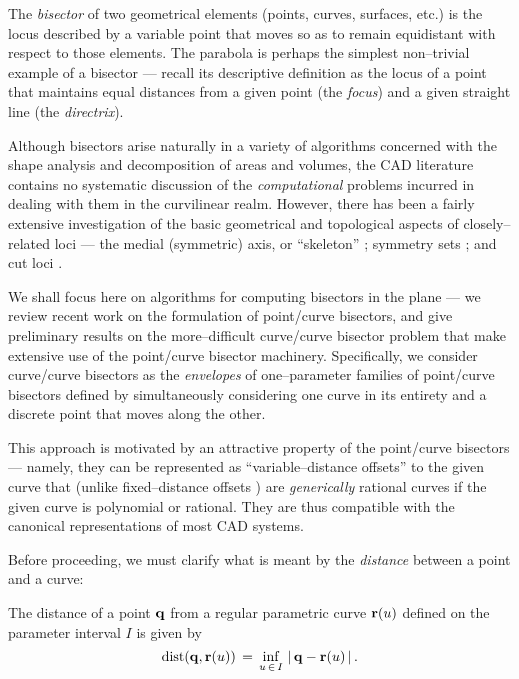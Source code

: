 The {\it bisector\/} of two geometrical elements (points,
curves, surfaces, etc.) is the locus described by a variable
point that moves so as to remain equidistant with respect to
those elements. The parabola is perhaps the simplest non--trivial
example of a bisector --- recall \cite{coxeter69} its descriptive
definition as the locus of a point that maintains equal distances
from a given point (the {\it focus}) and a given straight line
(the {\it directrix}).

Although bisectors arise naturally in a variety of algorithms
\cite{bookstein79,held91,lee82,yap87} concerned with the shape
analysis and decomposition of areas and volumes, the CAD literature
contains no systematic discussion of the {\it computational\/}
problems incurred in dealing with them in the curvilinear realm.
However, there has been a fairly extensive investigation of the
basic geometrical and topological aspects of closely--related
loci --- the medial (symmetric) axis, or ``skeleton'' \cite
{blum67,blum73,blum78}; symmetry sets \cite
{banchoff87,bruce85,bruce86,giblin85}; and cut loci
\cite{wolter85,wolter92}.

We shall focus here on algorithms for computing bisectors in
the plane --- we review recent work \cite{farouki91} on the
formulation of point/curve bisectors, and give preliminary
results on the more--difficult curve/curve bisector problem
that make extensive use of the point/curve bisector machinery.
Specifically, we consider curve/curve bisectors as the {\it
envelopes\/} of one--parameter families of point/curve bisectors
defined by simultaneously considering one curve in its entirety
and a discrete point that moves along the other.

This approach is motivated by an attractive property of the
point/curve bisectors --- namely, they can be represented as
``variable--distance offsets'' to the given curve that (unlike
fixed--distance offsets \cite{farouki90a,farouki90b}) are {\it
generically\/} rational curves if the given curve is polynomial
or rational. They are thus compatible with the canonical
representations of most CAD systems.

Before proceeding, we must clarify what is meant by the
{\it distance\/} between a point and a curve:

\begin{dfn}
The distance of a point ${\bf q}$ from a regular parametric
curve ${\bf r}(u)$ defined on the parameter interval $I$ is
given by
\begin{equation} \label{distance}
{\rm dist}({\bf q},{\bf r}(u)) \,=\,
\inf_{u \,\in\, I} \, |\,{\bf q}-{\bf r}(u)\,| \,.
\end{equation}
\end{dfn}

